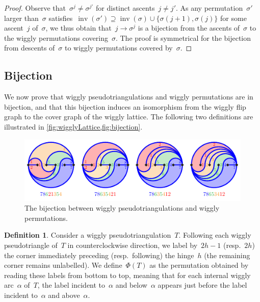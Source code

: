 \documentclass{amsart}
\theoremstyle{definition}
\newtheorem{definition}[theorem]{Definition}
\newcommand{\eqdef}{\mbox{\,\raisebox{0.2ex}{\scriptsize\ensuremath{\mathrm:}}\ensuremath{=}\,}} %
\DeclareMathOperator{\inv}{inv} %
\begin{document}
\begin{proof}
Observe that~$\sigma^j \ne \sigma^{j'}$ for distinct ascents~$j \ne j'$.
As any permutation~$\sigma'$ larger than~$\sigma$ satisfies~${\inv(\sigma') \supseteq \inv(\sigma) \cup \{\sigma(j+1), \sigma(j)\}}$ for some ascent~$j$ of~$\sigma$, we thus obtain that~$j \to \sigma^j$ is a bijection from the ascents of~$\sigma$ to the wiggly permutations covering~$\sigma$.
The proof is symmetrical for the bijection from descents of~$\sigma$ to wiggly permutations covered by~$\sigma$.
\end{proof}


\subsection{Bijection}
\label{subsec:bijection}

We now prove that wiggly pseudotriangulations and wiggly permutations are in bijection, and that this bijection induces an isomorphism from the wiggly flip graph to the cover graph of the wiggly lattice.
The following two definitions are illustrated in \cref{fig:wigglyLattice,fig:bijection}.

\begin{figure}
\centerline{\includegraphics[scale=1.7]{bijection}}
\caption{The bijection between wiggly pseudotriangulations and wiggly permutations.}
\label{fig:bijection}
\end{figure}


\begin{definition}
\label{def:bijection1}
Consider a wiggly pseudotriangulation~$T$.
Following each wiggly pseudotriangle of~$T$ in counterclockwise direction, we label by~$2h-1$ (resp.~$2h$) the corner immediately preceding (resp.~following) the hinge~$h$ (the remaining corner remains unlabelled).
We define~$\Phi(T)$ as the permutation obtained by reading these labels from bottom to top, meaning that for each internal wiggly arc~$\alpha$ of~$T$, the label incident to~$\alpha$ and below~$\alpha$ appears just before the label incident to~$\alpha$ and above~$\alpha$.
\end{definition}
\end{document}
